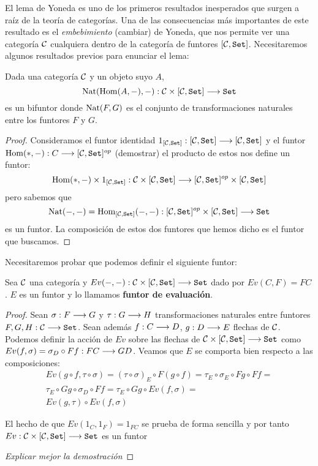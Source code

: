 El lema de Yoneda es uno de los primeros resultados
inesperados que surgen a raíz de la teoría de categorías. Una
de las consecuencias más importantes de este resultado es
el \textit{embebimiento} (cambiar) de Yoneda, que nos permite
ver una categoría $\mathcal{C}$ cualquiera dentro de la categoría de
funtores $[\mathcal{C}, \texttt{Set}]$. Necesitaremos algunos resultados
previos para enunciar el lema:

\begin{proposition*}
  Dada una categoría $\mathcal{C}$ y un objeto suyo
  $A$,
  $$\operatorname{Nat}(\operatorname{Hom}(A, -), -) : \mathcal{C} \times [\mathcal{C}, \texttt{Set}]\longrightarrow \texttt{Set}$$
  es un bifuntor donde $\operatorname{Nat}(F, G)$ es el conjunto de transformaciones
  naturales entre los funtores $F$ y $G$.
\end{proposition*}
\begin{proof}
  Consideramos el funtor identidad
  $1_{[\mathcal{C}, \texttt{Set}]} :[\mathcal{C}, \texttt{Set}]\longrightarrow [\mathcal{C}, \texttt{Set}]$ y el funtor
  $\operatorname{Hom}(*, -) : C\longrightarrow [\mathcal{C}, \texttt{Set}]^{op}$ (demostrar)
  el producto de estos nos define un funtor:
  $$\operatorname{Hom}(*, -)\times 1_{[\mathcal{C}, \texttt{Set}]} :
  \mathcal{C}\times [\mathcal{C}, \texttt{Set}]\longrightarrow  [\mathcal{C}, \texttt{Set}]^{op} \times [\mathcal{C}, \texttt{Set}]$$
  pero sabemos que
  $$\operatorname{Nat}(-, -) = \operatorname{Hom}_{[\mathcal{C}, \texttt{Set}]}(-, -) :
    [\mathcal{C}, \texttt{Set}]^{op}\times[\mathcal{C}, \texttt{Set}]\longrightarrow \texttt{Set}$$
    es un funtor. La composición de estos dos funtores
    que hemos dicho es el funtor que buscamos.
\end{proof}


Necesitaremos probar que podemos definir el siguiente funtor:

\begin{proposition*}
  Sea $\mathcal{C}$ una categoría y $Ev(-, -) : \mathcal{C}\times[\mathcal{C}, \texttt{Set}]\longrightarrow \texttt{Set}$
  dado por $Ev(C, F) = FC$. $E$ es un funtor y lo llamamos
  \textbf{funtor de evaluación}.
\end{proposition*}
\begin{proof}
  Sean $\sigma : F\longrightarrow G$ y $\tau : G\longrightarrow H$ transformaciones naturales entre funtores
  $F, G, H : \mathcal{C}\longrightarrow \texttt{Set}$. Sean además $f : C\longrightarrow D$,
  $g : D\longrightarrow E$ flechas de $\mathcal{C}$.
  Podemos definir la acción de $Ev$ sobre las flechas de
  $\mathcal{C}\times[\mathcal{C}, \texttt{Set}]\longrightarrow \texttt{Set}$ como
  $Ev(f, \sigma) = \sigma_D \circ Ff : FC\longrightarrow GD$. Veamos que $E$ se comporta bien
  respecto a las composiciones:
  \begin{multline*}
    Ev(g \circ f, \tau\circ\sigma) =
    (\tau \circ \sigma)_E\circ F(g\circ f) =
    \tau_E\circ\sigma_E\circ Fg \circ Ff = \\
  \tau_E\circ Gg \circ\sigma_D \circ Ff =
  \tau_E\circ Gg \circ Ev(f, \sigma) =\\
  Ev(g, \tau) \circ Ev(f, \sigma)
  \end{multline*}

  El hecho de que $Ev(1_C, 1_F) = 1_{FC}$ se prueba de forma sencilla
  y por tanto $Ev : \mathcal{C}\times[\mathcal{C}, \texttt{Set}]\longrightarrow \texttt{Set}$ es un funtor

  \textit{Explicar mejor la demostración}
\end{proof}

